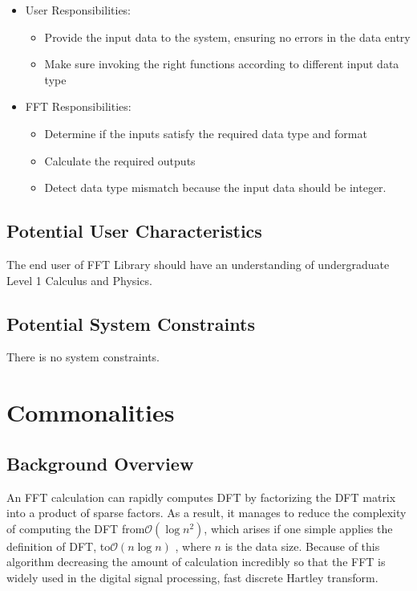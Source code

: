 \documentclass[12pt]{article}
\newcommand{\famname}{FFT} %
\begin{document}
\begin{itemize}
\item User Responsibilities:
\begin{itemize}
\item  Provide the input data to the system, ensuring no errors in the data entry
\item  Make sure invoking the right functions according to different input data type
\end{itemize}
\item \famname{} Responsibilities:
\begin{itemize}
\item Determine if the inputs satisfy the required data type and format
\item Calculate the required outputs
\item Detect data type mismatch because the input data should be integer.
\end{itemize}
\end{itemize}

\subsection{Potential User Characteristics} \label{SecUserCharacteristics}

The end user of \famname{} Library should have an understanding of undergraduate Level
1 Calculus and Physics.

\subsection{Potential System Constraints}
There is no system constraints.

\section{Commonalities}

\subsection{Background Overview} \label{Sec_Background} An FFT calculation can
rapidly computes DFT by factorizing the DFT matrix into a product of sparse
factors. As a result, it manages to reduce the complexity of computing the DFT
from$\mathcal{O}(\log{}n^2)$,  which arises
if one simple applies the definition of DFT, to$\mathcal{O}(n\log{}n)$ , where
$\mathcal{}n$ is the data size. Because of this algorithm decreasing the amount
of calculation incredibly so that the FFT is widely used in the digital signal
processing, fast discrete Hartley transform.
\end{document}
